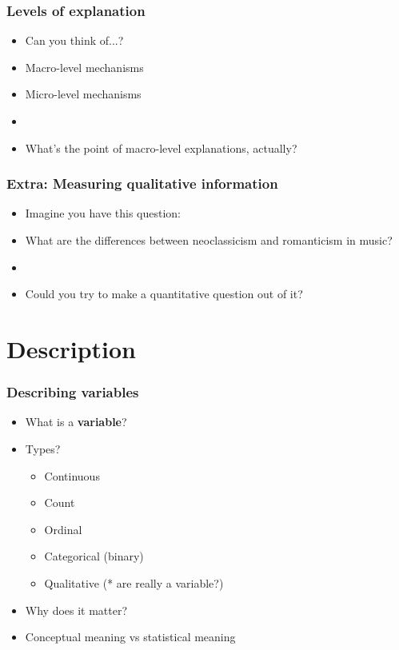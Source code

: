\documentclass[aspectratio=43]{beamer}
\begin{document}
\begin{frame}
\frametitle{Levels of explanation}
\centering

\begin{itemize}
\item[] Can you think of...?
\item Macro-level mechanisms
\item Micro-level mechanisms
\item[]
\item<2-> What's the point of macro-level explanations, actually?
\end{itemize}

\end{frame}

\begin{frame}
\frametitle{Extra: Measuring qualitative information}
\centering

\begin{itemize}
  \item Imagine you have this question:
  \item[] What are the differences between neoclassicism and romanticism in music?
  \item[]
  \item Could you try to make a quantitative question out of it?
\end{itemize}

\end{frame}

\section{Description}

\begin{frame}
\frametitle{Describing variables}
\centering

\begin{itemize}
  \item What is a \textbf{variable}?
  \item Types?
  \begin{itemize}
    \item<2-> Continuous
    \item<3-> Count
    \item<4-> Ordinal
    \item<5-> Categorical (binary)
    \item<6-> Qualitative (* are really a variable?)
  \end{itemize}
  \item<7-> Why does it matter?
  \item<7-> Conceptual meaning vs statistical meaning
\end{itemize}

\end{frame}
\end{document}
